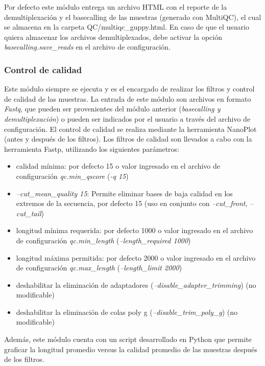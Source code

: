 Por defecto este módulo entrega un archivo HTML con el reporte de la demultiplexación y el basecalling de las muestras (generado con MultiQC), el cual se almacena en la carpeta QC/multiqc\_guppy.html.
En caso de que el usuario quiera almacenar los archivos demultiplexados, debe activar la opción \textit{basecalling.save\_reads} en el archivo de configuración.


\subsubsection{Control de calidad}
Este módulo siempre se ejecuta y es el encargado de realizar los filtros y control de calidad de las muestras.
La entrada de este módulo son archivos en formato \textit{Fastq}, que pueden ser provenientes del módulo anterior (\textit{basecalling y demultiplexación}) o pueden ser indicados por el usuario a través del archivo de configuración.
El control de calidad se realiza mediante la herramienta NanoPlot (antes y después de los filtros).
Los filtros de calidad son llevados a cabo con la herramienta Fastp, utilizando los siguientes parámetros:
\begin{itemize}
    \item calidad mínima: por defecto 15 o valor ingresado en el archivo de configuración \textit{qc.min\_qscore} (\textit{-q 15})
    \item \textit{--cut\_mean\_quality 15}: Permite eliminar bases de baja calidad en los extremos de la secuencia, por defecto 15 (uso en conjunto con \textit{--cut\_front}, \textit{--cut\_tail})
    \item longitud mínima requerida: por defecto 1000 o valor ingresado en el archivo de configuración \textit{qc.min\_length} (\textit{--length\_required 1000}) 
    \item longitud máxima permitida: por defecto 2000 o valor ingresado en el archivo de configuración \textit{qc.max\_length} (\textit{--length\_limit 2000})
    \item deshabilitar la eliminación de adaptadores (\textit{--disable\_adapter\_trimming}) (no modificable)
    \item deshabilitar la eliminación de colas poly g (\textit{--disable\_trim\_poly\_g}) (no modificable)
\end{itemize}

Además, este módulo cuenta con un script desarrollado en Python que permite graficar la longitud promedio versus la calidad promedio de las muestras después de los filtros.


